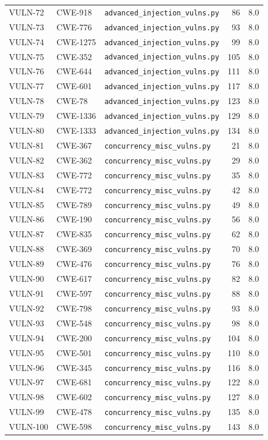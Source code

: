 \documentclass[11pt,a4paper]{article}
\begin{document}
\begin{longtable}{@{}l l l r l@{}}
VULN-72 & CWE-918 & \texttt{advanced\_injection\_vulns.py} & 86 & 8.0 \\
VULN-73 & CWE-776 & \texttt{advanced\_injection\_vulns.py} & 93 & 8.0 \\
VULN-74 & CWE-1275 & \texttt{advanced\_injection\_vulns.py} & 99 & 8.0 \\
VULN-75 & CWE-352 & \texttt{advanced\_injection\_vulns.py} & 105 & 8.0 \\
VULN-76 & CWE-644 & \texttt{advanced\_injection\_vulns.py} & 111 & 8.0 \\
VULN-77 & CWE-601 & \texttt{advanced\_injection\_vulns.py} & 117 & 8.0 \\
VULN-78 & CWE-78 & \texttt{advanced\_injection\_vulns.py} & 123 & 8.0 \\
VULN-79 & CWE-1336 & \texttt{advanced\_injection\_vulns.py} & 129 & 8.0 \\
VULN-80 & CWE-1333 & \texttt{advanced\_injection\_vulns.py} & 134 & 8.0 \\
VULN-81 & CWE-367 & \texttt{concurrency\_misc\_vulns.py} & 21 & 8.0 \\
VULN-82 & CWE-362 & \texttt{concurrency\_misc\_vulns.py} & 29 & 8.0 \\
VULN-83 & CWE-772 & \texttt{concurrency\_misc\_vulns.py} & 35 & 8.0 \\
VULN-84 & CWE-772 & \texttt{concurrency\_misc\_vulns.py} & 42 & 8.0 \\
VULN-85 & CWE-789 & \texttt{concurrency\_misc\_vulns.py} & 49 & 8.0 \\
VULN-86 & CWE-190 & \texttt{concurrency\_misc\_vulns.py} & 56 & 8.0 \\
VULN-87 & CWE-835 & \texttt{concurrency\_misc\_vulns.py} & 62 & 8.0 \\
VULN-88 & CWE-369 & \texttt{concurrency\_misc\_vulns.py} & 70 & 8.0 \\
VULN-89 & CWE-476 & \texttt{concurrency\_misc\_vulns.py} & 76 & 8.0 \\
VULN-90 & CWE-617 & \texttt{concurrency\_misc\_vulns.py} & 82 & 8.0 \\
VULN-91 & CWE-597 & \texttt{concurrency\_misc\_vulns.py} & 88 & 8.0 \\
VULN-92 & CWE-798 & \texttt{concurrency\_misc\_vulns.py} & 93 & 8.0 \\
VULN-93 & CWE-548 & \texttt{concurrency\_misc\_vulns.py} & 98 & 8.0 \\
VULN-94 & CWE-200 & \texttt{concurrency\_misc\_vulns.py} & 104 & 8.0 \\
VULN-95 & CWE-501 & \texttt{concurrency\_misc\_vulns.py} & 110 & 8.0 \\
VULN-96 & CWE-345 & \texttt{concurrency\_misc\_vulns.py} & 116 & 8.0 \\
VULN-97 & CWE-681 & \texttt{concurrency\_misc\_vulns.py} & 122 & 8.0 \\
VULN-98 & CWE-602 & \texttt{concurrency\_misc\_vulns.py} & 127 & 8.0 \\
VULN-99 & CWE-478 & \texttt{concurrency\_misc\_vulns.py} & 135 & 8.0 \\
VULN-100 & CWE-598 & \texttt{concurrency\_misc\_vulns.py} & 143 & 8.0 \\
\bottomrule \end{longtable}
\end{document}
